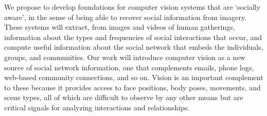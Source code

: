 

We propose to develop foundations for computer vision systems that are `socially aware', in the sense of being able to recover social information from imagery. These systems will extract, from images and videos of human gatherings,  information about the types and frequencies of social interactions that occur, and compute useful information about the social network that embeds the individuals, groups, and communities.  Our work will introduce computer vision as a new source of social network information, one that complements emails, phone logs, web-based community connections, and so on. Vision is an important complement to these because it provides access to face positions, body poses, movements, and scene types, all of which are difficult to observe by any other means but are critical signals for analyzing interactions and relationships. 


